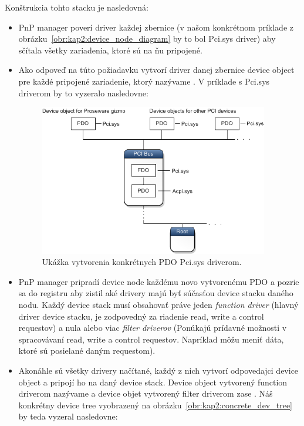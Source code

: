 Konštrukcia tohto stacku je nasledovná:
\begin{itemize}
\item PnP manager poverí driver každej zbernice (v našom konkrétnom príklade z obrázku~\ref{obr:kap2:device_node_diagram} by to bol Pci.sys driver) aby sčítala všetky zariadenia, ktoré sú na ňu pripojené.
\item Ako odpoveď na túto požiadavku vytvorí driver danej zbernice device object pre každé pripojené zariadenie, ktorý nazývame . V príklade s Pci.sys driverom by to vyzeralo nasledovne:

\begin{figure}[!htb]
	\centering
	\includegraphics[width=10cm]{img/kap02_PDO}
	\caption{Ukážka vytvorenia konkrétnych PDO Pci.sys driverom.}
	\label{obr:kap2:pdo}
\end{figure}

\item PnP manager pripradí device node každému novo vytvorenému PDO a pozrie sa do registru aby zistil aké drivery majú byť súčasťou device stacku daného nodu. Každý device stack musí obsahovať práve jeden \textit{function driver} (hlavný driver device stacku, je zodpovedný za riadenie read, write a control requestov) a nula alebo viac \textit{filter driverov} (Ponúkajú prídavné možnosti v spracovávaní read, write a control requestov. Napríklad môžu meniť dáta, ktoré sú posielané daným requestom).
\item Akonáhle sú všetky drivery načítané, každý z nich vytvorí odpovedajci device object a pripojí ho na daný device stack. Device object vytvorený function driverom nazývame  a device objet vytvorený filter driverom zase . Náš konkrétny device tree vyobrazený na obrázku~\ref{obr:kap2:concrete_dev_tree} by teda vyzeral nasledovne:


\end{itemize}
